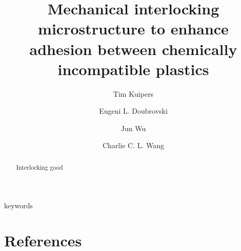 \documentclass[5p,twocolumn,10pt,times]{elsarticle}
\theoremstyle{definition}
\newcommand{\temp}[1]{\textcolor[rgb]{0, 0, 0.2}{#1}}
\begin{document}
\baselineskip11pt 

\begin{frontmatter} 

\title{Mechanical interlocking microstructure to enhance adhesion between chemically incompatible plastics}


\author[um,tud]{Tim Kuipers}
\author[tud]{Eugeni L. Doubrovski}
\author[tud]{Jun Wu}
\author[cuhk]{Charlie C. L. Wang}
\address[um]{Ultimaker, Utrecht, The Netherlands}
\address[tud]{Department of Sustainable Design Engineering, Delft University of Technology, The Netherlands}
\address[cuhk]{Department of Mechanical and Automation Engineering, The Chinese University of Hong Kong, Hong Kong SAR, China}


\begin{abstract}
Interlocking good
\end{abstract}

%
%


\begin{keyword} 
keywords
\end{keyword}

\end{frontmatter}





















\section*{References}



%
\end{document}
